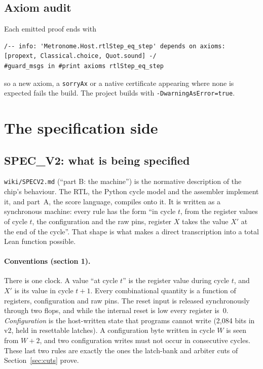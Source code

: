 \documentclass[11pt,a4paper]{article}
\newcommand{\brkus}{\textunderscore\allowbreak}
\newcommand{\code}[1]{{\let\_\brkus\texttt{#1}}}
\newcommand{\lean}[1]{\texttt{\detokenize{#1}}}
\begin{document}
\subsection{Axiom audit}

Each emitted proof ends with
\begin{lstlisting}
/-- info: 'Metronome.Host.rtlStep_eq_step' depends on axioms: [propext, Classical.choice, Quot.sound] -/
#guard_msgs in #print axioms rtlStep_eq_step
\end{lstlisting}
so a new axiom, a \code{sorryAx} or a native certificate appearing where none
is expected fails the build. The project builds with
\code{-DwarningAsError=true}.

\section{The specification side}

\subsection{SPEC\_V2: what is being specified}
\label{sec:specv2}

\code{wiki/SPEC\_V2.md} (``part B: the machine'') is the normative description
of the chip's behaviour. The RTL, the Python cycle model and the assembler
implement it, and part~A, the score language, compiles onto it. It is written as
a synchronous machine: every rule has the form ``in cycle $t$, from the register
values of cycle $t$, the configuration and the raw pins, register $X$ takes the
value $X'$ at the end of the cycle''. That shape is what makes a direct
transcription into a total Lean function \lean{Machine.step} possible.

\paragraph{Conventions (section 1).} There is one clock. A value ``at cycle
$t$'' is the register value during cycle $t$, and $X'$ is its value in cycle
$t+1$. Every combinational quantity is a function of registers, configuration and
raw pins. The reset input is released synchronously through two flops, and while
the internal reset is low every register is~0. \emph{Configuration} is the
host-written state that programs cannot write (2,084 bits in v2, held in
resettable latches). A configuration byte written in cycle $W$ is seen from
$W+2$, and two configuration writes must not occur in consecutive cycles. These
last two rules are exactly the ones the latch-bank and arbiter cuts of
Section~\ref{sec:cuts} prove.
\end{document}
